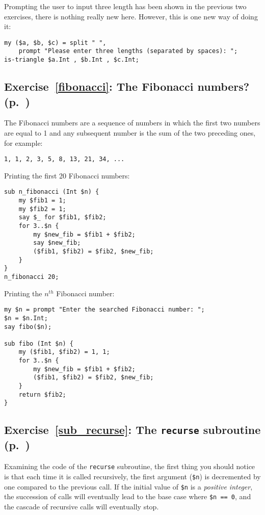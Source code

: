 Prompting the user to input three length has been shown in 
the previous two exercises, there is nothing really new here.
However, this is one new way of doing it:

\begin{verbatim}
my ($a, $b, $c) = split " ", 
    prompt "Please enter three lengths (separated by spaces): ";
is-triangle $a.Int , $b.Int , $c.Int;
\end{verbatim}


\subsection{Exercise~\ref{fibonacci}: The Fibonacci numbers? (p.~\pageref{fibonacci})}
\label{sol_fibonacci}

The Fibonacci numbers are a sequence of numbers in which the 
first two numbers are equal to 1 and any subsequent number is the 
sum of the two preceding ones, for example:
\begin{verbatim}
1, 1, 2, 3, 5, 8, 13, 21, 34, ...
\end{verbatim}

Printing the first 20 Fibonacci numbers:

\begin{verbatim}
sub n_fibonacci (Int $n) {
    my $fib1 = 1;
    my $fib2 = 1;
    say $_ for $fib1, $fib2;
    for 3..$n {
        my $new_fib = $fib1 + $fib2;
        say $new_fib;
        ($fib1, $fib2) = $fib2, $new_fib;
    }
}
n_fibonacci 20;
\end{verbatim}

Printing the $n^{th}$ Fibonacci number:

\begin{verbatim}
my $n = prompt "Enter the searched Fibonacci number: ";
$n = $n.Int;
say fibo($n);

sub fibo (Int $n) {
    my ($fib1, $fib2) = 1, 1;
    for 3..$n {
        my $new_fib = $fib1 + $fib2;
        ($fib1, $fib2) = $fib2, $new_fib;
    }
    return $fib2;
}    
\end{verbatim}

\subsection{Exercise~\ref{sub_recurse}: The {\tt recurse} subroutine (p.~\pageref{sub_recurse})}
\label{sol_sub_recurse}

Examining the code of the {\tt recurse} subroutine, the 
first thing you should notice is that each time it 
is called recursively, the first argument (\verb'$n') is 
decremented by one compared to the previous call. If the 
initial value of \verb'$n' is a \emph{positive integer}, the 
succession of calls will eventually lead to the base case 
where \verb'$n == 0', and the cascade of recursive calls 
will eventually stop. 


